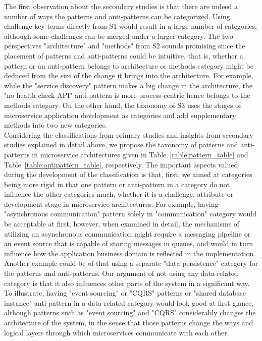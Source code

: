 \documentclass{Configuration_Files/PoliMi3i_thesis}
\begin{document}
The first observation about the secondary studies is that there are indeed a number of ways the patterns and anti-patterns can be categorized.
Using challenge key terms directly from S1 would result in a large number of categories, although some challenges can be merged under a larger category.
The two perspectives "architecture" and "methods" from S2 sounds promising since the placement of patterns and anti-patterns could be intuitive, that is, whether a pattern or an anti-pattern belongs to architecture or methods category might be deduced from the size of the change it brings into the architecture.
For example, while the "service discovery" pattern makes a big change in the architecture, the "no health check API" anti-pattern is more process-centric hence belongs to the methods category.
On the other hand, the taxonomy of S3 uses the stages of microservice application development as categories and add supplementary methods into two new categories.
\\
Considering the classifications from primary studies and insights from secondary studies explained in detail above, we propose the taxonomy of patterns and anti-patterns in microservice architectures given in Table~\ref{table:pattern_table} and Table~\ref{table:antipattern_table}, respectively.
The important aspects valued during the development of the classification is that, first, we aimed at categories being more rigid in that one pattern or anti-pattern in a category do not influence the other categories much, whether it is a challenge, attribute or development stage in microservice architectures.
For example, having "asynchronous communication" pattern solely in "communication" category would be acceptable at first, however, when examined in detail, the mechanisms of utilizing an asynchronous communication might require a messaging pipeline or an event source that is capable of storing messages in queues, and would in turn influence how the application business domain is reflected in the implementation.
Another example could be of that using a separate "data persistence" category for the patterns and anti-patterns.
Our argument of not using any data-related category is that it also influences other parts of the system in a significant way.
To illustrate, having "event sourcing" or "CQRS" patterns or "shared database instance" anti-pattern in a data-related category would look good at first glance, although patterns such as "event sourcing" and "CQRS" considerably changes the architecture of the system, in the sense that those patterns change the ways and logical layers through which microservices communicate with each other.
\end{document}
